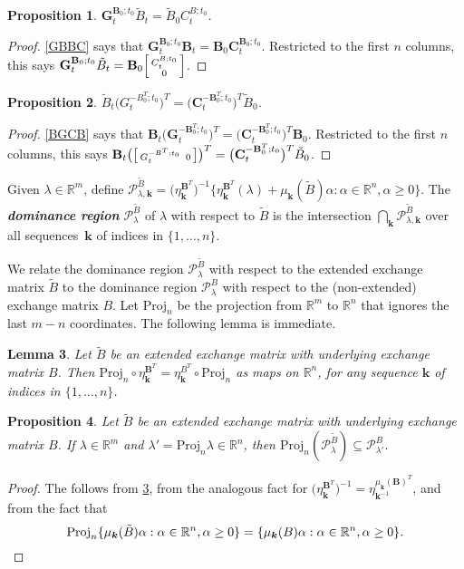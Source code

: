 \documentclass{amsart}
\newtheorem{proposition}{Proposition}[section]
\newtheorem{lemma}[proposition]{Lemma}
\theoremstyle{definition}
\theoremstyle{remark}
\numberwithin{equation}{section}
\newcommand{\newword}[1]{\textbf{\emph{#1}}}
\newcommand{\reals}{\mathbb R}
\newcommand{\set}[1]{{\lbrace #1 \rbrace}}
\newcommand{\sett}[1]{{\bigl\lbrace #1 \bigr\rbrace}}
\newcommand{\GG}{{\mathbf G}}
\newcommand{\CC}{{\mathbf C}}
\newcommand{\0}{{\mathbf{0}}}
\newcommand{\Proj}{\mathrm{Proj}}
\newcommand{\kk}{{\boldsymbol{k}}}
\newcommand{\tB}{{\tilde{B}}}
\newcommand{\BB}{\mathbf{B}}
\renewcommand{\P}{\mathcal{P}}
\begin{document}
\begin{proposition}\label{GBBC ext}
$\GG_t^{\BB_0;t_0}\tB_t=\tB_0C_t^{B;t_0}$.
\end{proposition}
\begin{proof}
\cref{GBBC} says that $\GG_t^{\BB_0;t_0}\BB_t=\BB_0\CC_t^{\BB_0;t_0}$.
Restricted to the first $n$ columns, this says $\GG_t^{\BB_0;t_0}\tB_t=\BB_0\begin{bsmallmatrix}C_t^{B;t_0}\\0\end{bsmallmatrix}$.
\end{proof}

\begin{proposition}\label{BGCB ext}
$\tB_t\bigl(G_t^{-B_0^T;t_0}\bigr)^T=\bigl(\CC_t^{-\BB_0^T;t_0}\bigr)^T\tB_0$.
\end{proposition}
\begin{proof}
\cref{BGCB} says that $\BB_t\bigl(\GG_t^{-\BB_0^T;t_0}\bigr)^T=\bigl(\CC_t^{-\BB_0^T;t_0}\bigr)^T\BB_0$.
Restricted to the first $n$ columns, this says $\BB_t\bigl(\begin{bsmallmatrix}G_t^{-B^T;t_0}&\,0\end{bsmallmatrix}\bigr)^T=\bigl(\CC_t^{-\BB_0^T;t_0}\bigr)^T\tB_0$.
\end{proof}

Given $\lambda\in\reals^m$, define $\P^\tB_{\lambda,\kk}=\bigl(\eta_{\kk}^{\BB^T}\bigr)^{-1}\sett{\eta_\kk^{\BB^T}(\lambda)+\mu_\kk(\tB)\alpha:\alpha\in\reals^n,\alpha\ge0}$.
The \newword{dominance region} $\P^\tB_\lambda$ of $\lambda$ with respect to $\tB$ is the intersection $\bigcap_\kk\P^\tB_{\lambda,\kk}$ over all sequences~$\kk$ of indices in $\set{1,\ldots,n}$.

We relate the dominance region $\P_\lambda^\tB$ with respect to the extended exchange matrix $\tB$ to the dominance region $\P_\lambda^B$ with respect to the (non-extended) exchange matrix $B$.
Let $\Proj_n$ be the projection from $\reals^m$ to $\reals^n$ that ignores the last $m-n$ coordinates.
The following lemma is immediate.

\begin{lemma}\label{eta proj}
Let $\tB$ be an extended exchange matrix with underlying exchange matrix $B$.
Then $\Proj_n\circ\eta_\kk^{\BB^T}=\eta_\kk^{B^T}\circ\Proj_n$ as maps on $\reals^n$, for any sequence $\kk$ of indices in $\set{1,\ldots,n}$.
\end{lemma}



\begin{proposition}\label{contains proj}
Let $\tB$ be an extended exchange matrix with underlying exchange matrix $B$.
If $\lambda\in\reals^m$ and $\lambda'=\Proj_n\lambda\in\reals^n$, then $\Proj_n(\P_\lambda^\tB)\subseteq\P_{\lambda'}^B$.
\end{proposition}
\begin{proof}
The  follows from \cref{eta proj}, from the analogous fact for $\bigl(\eta_\kk^{\BB^T}\bigr)^{-1}=\eta_{\kk^{-1}}^{\mu_\kk(\BB)^T}$, and from the fact that 
\[\Proj_n\set{\mu_\kk(\tB)\alpha:\alpha\in\reals^n,\alpha\ge0}=\set{\mu_\kk(B)\alpha:\alpha\in\reals^n,\alpha\ge0}.\qedhere\]
\end{proof}
\end{document}
